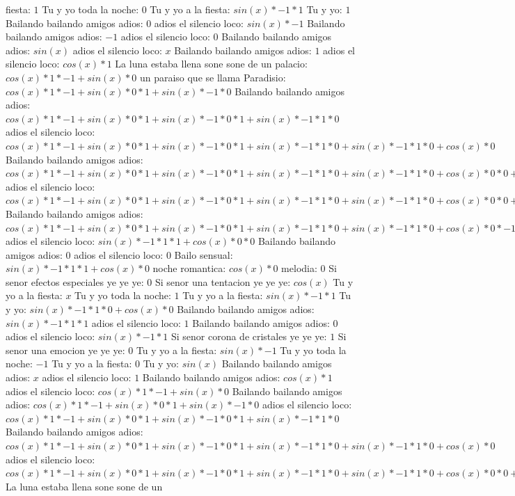 \documentclass{article}
\begin{document}
fiesta: $1$ Tu y yo toda la noche: $0$  \newline Tu y yo a la fiesta: $sin(x)*-1*1$ Tu y yo: $1$ Bailando bailando amigos adios: $0$  \newline adios el silencio loco: $sin(x)*-1$ Bailando bailando amigos adios: $-1$ adios el silencio loco: $0$  \newline Bailando bailando amigos adios: $sin(x)$  \newline adios el silencio loco: $x$ Bailando bailando amigos adios: $1$  \newline adios el silencio loco: $cos(x)*1$ La luna estaba llena sone sone de un palacio: $cos(x)*1*-1+sin(x)*0$ un paraiso que se llama Paradisio: ${cos(x)*1*-1+sin(x)*0}*1+sin(x)*-1*0$ Bailando bailando amigos adios: ${{cos(x)*1*-1+sin(x)*0}*1+sin(x)*-1*0}*1+sin(x)*-1*1*0$ adios el silencio loco: ${{cos(x)*1*-1+sin(x)*0}*1+sin(x)*-1*0}*1+sin(x)*-1*1*0+sin(x)*-1*1*0+cos(x)*0$ Bailando bailando amigos adios: ${{{cos(x)*1*-1+sin(x)*0}*1+sin(x)*-1*0}*1+sin(x)*-1*1*0+sin(x)*-1*1*0+cos(x)*0}*0+{sin(x)*-1*1*1+cos(x)*0}*0$ adios el silencio loco: ${{{cos(x)*1*-1+sin(x)*0}*1+sin(x)*-1*0}*1+sin(x)*-1*1*0+sin(x)*-1*1*0+cos(x)*0}*0+{sin(x)*-1*1*1+cos(x)*0}*0+{sin(x)*-1*1*1+cos(x)*0}*0+cos(x)*1*0$ Bailando bailando amigos adios: ${{{cos(x)*1*-1+sin(x)*0}*1+sin(x)*-1*0}*1+sin(x)*-1*1*0+sin(x)*-1*1*0+cos(x)*0}*-1+{sin(x)*-1*1*1+cos(x)*0}*0$  \newline adios el silencio loco: ${sin(x)*-1*1*1+cos(x)*0}*0$ Bailando bailando amigos adios: $0$ adios el silencio loco: $0$  \newline Bailo sensual: $sin(x)*-1*1*1+cos(x)*0$  \newline noche romantica: $cos(x)*0$ melodia: $0$ Si senor efectos especiales ye ye ye: $0$  \newline Si senor una tentacion ye ye ye: $cos(x)$  \newline Tu y yo a la fiesta: $x$ Tu y yo toda la noche: $1$  \newline Tu y yo a la fiesta: $sin(x)*-1*1$ Tu y yo: $sin(x)*-1*1*0+cos(x)*0$ Bailando bailando amigos adios: $sin(x)*-1*1*1$ adios el silencio loco: $1$ Bailando bailando amigos adios: $0$  \newline adios el silencio loco: $sin(x)*-1*1$ Si senor corona de cristales ye ye ye: $1$ Si senor una emocion ye ye ye: $0$  \newline Tu y yo a la fiesta: $sin(x)*-1$ Tu y yo toda la noche: $-1$ Tu y yo a la fiesta: $0$  \newline Tu y yo: $sin(x)$  \newline Bailando bailando amigos adios: $x$ adios el silencio loco: $1$  \newline Bailando bailando amigos adios: $cos(x)*1$ adios el silencio loco: $cos(x)*1*-1+sin(x)*0$ Bailando bailando amigos adios: ${cos(x)*1*-1+sin(x)*0}*1+sin(x)*-1*0$ adios el silencio loco: ${{cos(x)*1*-1+sin(x)*0}*1+sin(x)*-1*0}*1+sin(x)*-1*1*0$ Bailando bailando amigos adios: ${{cos(x)*1*-1+sin(x)*0}*1+sin(x)*-1*0}*1+sin(x)*-1*1*0+sin(x)*-1*1*0+cos(x)*0$ adios el silencio loco: ${{{cos(x)*1*-1+sin(x)*0}*1+sin(x)*-1*0}*1+sin(x)*-1*1*0+sin(x)*-1*1*0+cos(x)*0}*0+{sin(x)*-1*1*1+cos(x)*0}*0$ La luna estaba llena sone sone de un 
\end{document}
